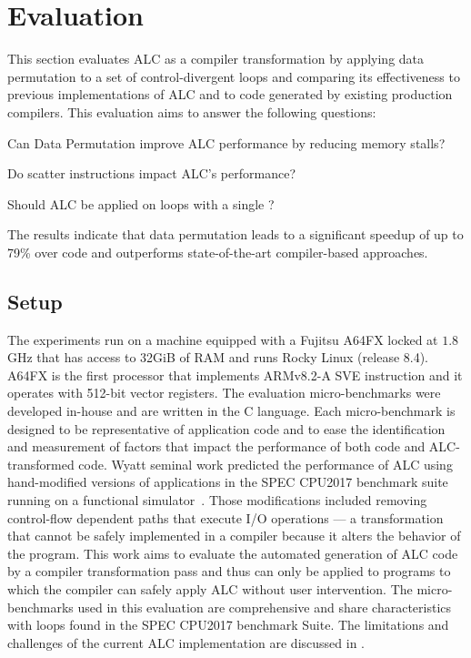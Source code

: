 \section{Evaluation}
\label{sec:evaluation}

This section evaluates ALC as a compiler transformation by applying data permutation to a set of control-divergent loops and comparing its effectiveness to previous implementations of ALC and to code generated by existing production compilers. 
This evaluation aims to answer the following questions:

\noindent{} Can Data Permutation improve ALC performance by reducing memory stalls?

\noindent{} Do scatter instructions impact ALC's performance?

\noindent{} Should ALC be applied on loops with a single \cpath?

The results indicate that data permutation leads to a significant speedup of up to 79\% over \ifconverted code and outperforms state-of-the-art compiler-based approaches.

\subsection{Setup}
\label{sec:setup}

The experiments run on a machine equipped with a Fujitsu A64FX locked at $1.8$GHz that has access to 32GiB of RAM and runs Rocky Linux (release 8.4).
A64FX is the first processor that implements ARMv8.2-A SVE instruction and it operates with 512-bit vector registers.
The evaluation micro-benchmarks were developed in-house and are written in the C language.
Each micro-benchmark is designed to be representative of application code and to ease the identification and measurement of factors that impact the performance of both \ifconverted code and ALC-transformed code.
Wyatt \etal seminal work predicted the performance of ALC using hand-modified versions of applications in the SPEC CPU2017 benchmark suite running on a functional simulator~\cite{spec}.
Those modifications included removing control-flow dependent paths that execute I/O operations --- a transformation that cannot be safely implemented in a compiler because it alters the behavior of the program.
This work aims to evaluate the automated generation of ALC code by a compiler transformation pass and thus can only be applied to programs to which the compiler can safely apply ALC without user intervention.
The micro-benchmarks used in this evaluation are comprehensive and share characteristics with loops found in the SPEC CPU2017 benchmark Suite.
The limitations and challenges of the current ALC implementation are discussed in .

